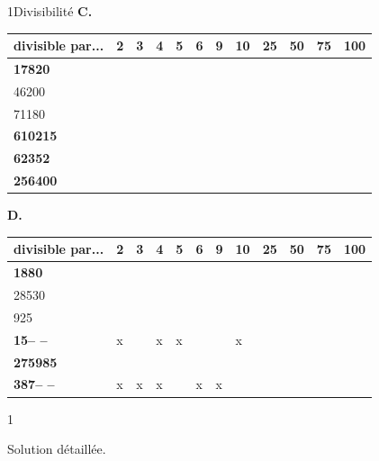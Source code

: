 \begin{exercice}{1}{Divisibilité}
\textbf{C.}
\bigskip

\begin{tabular}{|l|l|l|l|l|l|l|l|l|l|l|l|} 
\hline
\textbf{divisible par...} & \textbf{2} \; \; & \textbf{3} \; \; & \textbf{4} \; \; & \textbf{5}  \; \;& \textbf{6}  \; \;&  \textbf{9}  \; \;&  \textbf{10} \; \; &  \textbf{25} \; \; &  \textbf{50} \; \; &  \textbf{75} \; \; &  \textbf{100}  \\ 
\hline
\textbf{17820}            &           &           &          &           &  &  &   &    &    &    &      \\ 
\hline
46200                     &           &           &           &           &  &   &   &   &   &    &     \\ 
\hline
71180                     &           &            &           &           &   &   &   &    &    &    &      \\ 
\hline
\textbf{610215}           &            &           &            &           &   &   &    &    &    &    &      \\ 
\hline
\textbf{62352}            &           &          &           &            &  &  &    &    &    &    &      \\ 
\hline
\textbf{256400}           &           &            &           &           &   &   &   &   &   &    &     \\
\hline
\end{tabular}
\bigskip

\textbf{D.}
\bigskip

\begin{tabular}{|l|l|l|l|l|l|l|l|l|l|l|l|} 
\hline
\textbf{divisible par...} & \textbf{2} \; \; & \textbf{3} \; \; & \textbf{4} \; \; & \textbf{5}  \; \;& \textbf{6}  \; \;&  \textbf{9}  \; \;&  \textbf{10} \; \; &  \textbf{25} \; \; &  \textbf{50} \; \; &  \textbf{75} \; \; &  \textbf{100}  \\ \hline
\textbf{1880}            &           &          &           &           &  &  &   &    &    &    &      \\ 
\hline
28530                     &           &           &           &           &  &   &   &   &  &    &     \\ 
\hline
925                     &           &            &           &           &   &   &   &    &    &    &      \\ 
\hline
\textbf{15--  --}           & x           &           & x           & x          &   &   & x   &    &    &    &      \\ 
\hline
\textbf{275985}            &           &           &           &            &  &  &    &    &    &    &      \\ 
\hline
\textbf{387--   --}           & x          & x           & x         &           &x  &  x &   &   &   &    &     \\
\hline
\end{tabular}

\end{exercice}
\begin{solution}{1}

Solution détaillée.

\end{solution}
